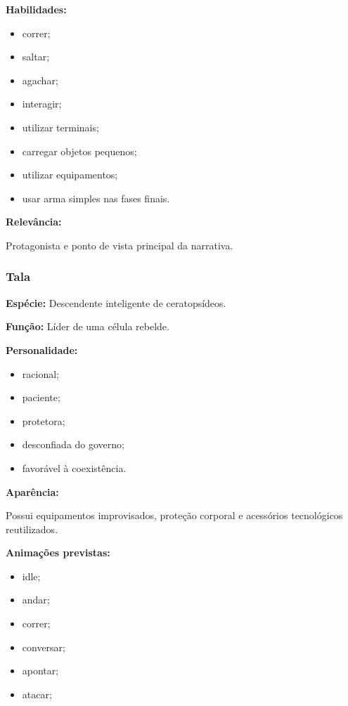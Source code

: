 \documentclass[12pt,a4paper]{article}
\begin{document}
\textbf{Habilidades:}

\begin{itemize}
    \item correr;
    \item saltar;
    \item agachar;
    \item interagir;
    \item utilizar terminais;
    \item carregar objetos pequenos;
    \item utilizar equipamentos;
    \item usar arma simples nas fases finais.
\end{itemize}

\textbf{Relevância:}

Protagonista e ponto de vista principal da narrativa.


\subsubsection*{Tala}

\textbf{Espécie:} Descendente inteligente de ceratopsídeos.

\textbf{Função:} Líder de uma célula rebelde.

\textbf{Personalidade:}

\begin{itemize}
    \item racional;
    \item paciente;
    \item protetora;
    \item desconfiada do governo;
    \item favorável à coexistência.
\end{itemize}

\textbf{Aparência:}

Possui equipamentos improvisados, proteção corporal e acessórios
tecnológicos reutilizados.

\textbf{Animações previstas:}

\begin{itemize}
    \item idle;
    \item andar;
    \item correr;
    \item conversar;
    \item apontar;
    \item atacar;
\end{itemize}
\end{document}
